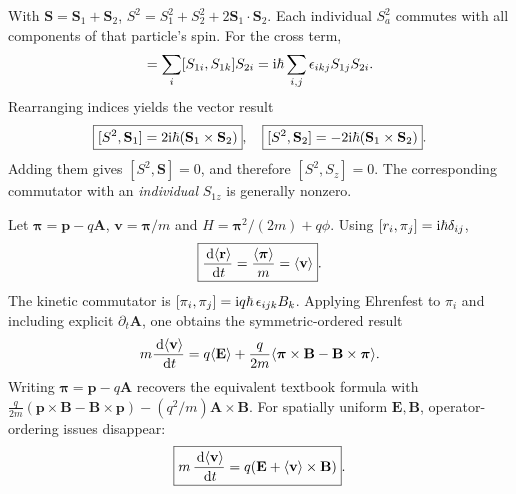 With $\mathbf S=\mathbf S_1+\mathbf S_2$,
$S^2=S_1^2+S_2^2+2\mathbf S_1\cdot\mathbf S_2$.
Each individual $S_a^2$ commutes with all
components of that particle's spin.
For the cross term,
\begin{equation}
[S_1\cdot S_2,S_{1k}]
=\sum_i[S_{1i},S_{1k}]S_{2i}
=\ii\sh\sum_{i,j}\epsilon_{ikj}S_{1j}S_{2i}.
\end{equation}
Rearranging indices yields the vector result
\begin{equation}
\boxed{[S^2,\mathbf S_1]
=2\mathrm i\hbar(\mathbf S_1\times\mathbf S_2)},
\quad
\boxed{[S^2,\mathbf S_2]
=-2\mathrm i\hbar(\mathbf S_1\times\mathbf S_2)}.
\end{equation}
Adding them gives $[S^2,\mathbf S]=0$,
and therefore $\boxed{[S^2,S_z]=0}$.
The corresponding commutator with an
\emph{individual} $S_{1z}$ is generally nonzero.

Let $\boldsymbol\pi=\mathbf p-q\mathbf A$,
$\mathbf v=\boldsymbol\pi/m$ and
$H=\boldsymbol\pi^2/(2m)+q\phi$.
Using $[r_i,\pi_j]=\mathrm i\hbar\delta_{ij}$,
\begin{equation}
\boxed{\frac{\,\mathrm d\langle \mathbf r\rangle}{\,\mathrm d t}
=\frac{\langle \boldsymbol\pi\rangle}m=\langle \mathbf v\rangle}.
\end{equation}
The kinetic commutator is
$[\pi_i,\pi_j]=\mathrm i q\hbar\,\epsilon_{ijk}B_k$.
Applying Ehrenfest to $\pi_i$ and
including explicit $\partial_t\mathbf A$,
one obtains the symmetric-ordered result
\begin{equation}
m\frac{\,\mathrm d\langle \mathbf v\rangle}{\,\mathrm d t}
=q\langle \mathbf E\rangle
+\frac{q}{2m}
\langle \boldsymbol\pi\times\mathbf B-
\mathbf B\times\boldsymbol\pi\rangle.
\end{equation}
Writing $\boldsymbol\pi=\mathbf p-q\mathbf A$
recovers the equivalent textbook formula with
$\frac q{2m}(\mathbf p\times\mathbf B-
\mathbf B\times\mathbf p)-(q^2/m)\mathbf A\times\mathbf B$.
For spatially uniform $\mathbf E,\mathbf B$,
operator-ordering issues disappear:
\begin{equation}
\boxed{m\,\frac{\,\mathrm d\langle \mathbf v\rangle}{\,\mathrm d t}
=q(\mathbf E+\langle \mathbf v\rangle\times\mathbf B)}.
\end{equation}

